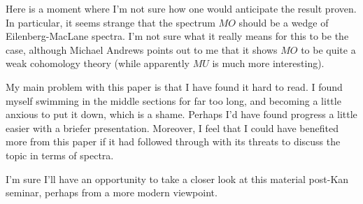 \documentclass[11pt]{article}
\begin{document}
\begin{ThomGlobalPropertiesPartTwo}
Here is a moment where I'm not sure how one would anticipate the result proven. In particular, it seems strange that the spectrum $MO$ should be a wedge of Eilenberg-MacLane spectra. I'm not sure what it really means for this to be the case, although Michael Andrews points out to me that it shows $MO$ to be quite a weak cohomology theory (while apparently $MU$ is much more interesting).

My main problem with this paper is that I have found it hard to read. I found myself swimming in the middle sections for far too long, and becoming a little anxious to put it down, which is a shame. Perhaps I'd have found progress a little easier with a briefer presentation. Moreover, I feel that I could have benefited more from this paper if it had followed through with its threats to discuss the topic in terms of spectra.

I'm sure I'll have an opportunity to take a closer look at this material post-Kan seminar, perhaps from a more modern viewpoint.
\pagebreak
\end{ThomGlobalPropertiesPartTwo}
\end{document}
